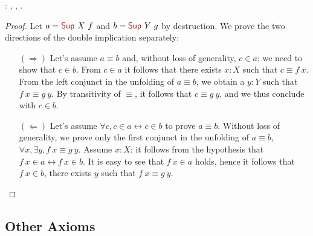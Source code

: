 \begin{coqdoccode}
  \coqdocnoindent
   : \coqdockw{\ensuremath{\forall}}  ,     \coqdockw{\ensuremath{\forall}} ,       .\coqdoceol
\end{coqdoccode}
\begin{proof}
  Let $a = \coqdocconstructor{Sup}~X~f$ and $b = \coqdocconstructor{Sup}~Y~g$ by destruction.
  We prove the two directions of the double implication separately:
  \begin{itemize}
    \item[$(\Rightarrow)$]
      Let's assume $a \equiv b$ and, without loss of generality, $c \in a$; we need to show that $c \in b$. From $c \in a$ it follows that there exists $x\colon X$ such that $c \equiv f~x$. From the left conjunct in the unfolding of $a \equiv b$, we obtain a $y\colon Y$ such that $f~x \equiv g~y$. By transitivity of $\equiv$, it follows that $c \equiv g~y$, and we thus conclude with $c \in b$.
    \item[$(\Leftarrow)$] Let's assume $\forall c, c\in a \leftrightarrow c \in b$ to prove $a \equiv b$. Without loss of generality, we prove only the first conjunct in the unfolding of $a \equiv b$, \ie{} $\forall x, \exists y, f~x \equiv g~y$. Assume $x\colon X$: it follows from the hypothesis that $f~x\in a \leftrightarrow f~x \in b$. It is easy to see that $f~x\in a$ holds, hence it follows that $f~x \in b$, \ie{} there exists $y$ such that $f~x \equiv g~y$.
    \qedhere
  \end{itemize}
\end{proof}

\subsection{Other \ZF{} Axioms}
\TODO{}
